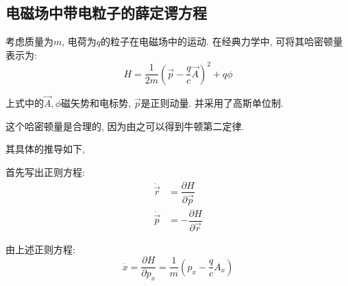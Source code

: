 \documentclass[a4paper, 11pt]{article}
\begin{document}
\begin{spacing}{1.2}
      \subsection{电磁场中带电粒子的薛定谔方程}

        考虑质量为$m$, 电荷为$q$的粒子在电磁场中的运动. 在经典力学中, 可将其哈密顿量表示为:
        \begin{equation}
          H = \dfrac{1}{2m}\left(\vec{p}-\dfrac{q}{c}\vec{A}\right)^2+q\phi
        \end{equation}

        上式中的$\vec{A}, \phi$磁矢势和电标势, $\vec{p}$是正则动量. 并采用了高斯单位制.

        这个哈密顿量是合理的, 因为由之可以得到牛顿第二定律.

        其具体的推导如下,

        首先写出正则方程:
        \begin{subequations}
          \begin{align}
            \dot{\vec{r}} &= \dfrac{\partial{}H}{\partial{}\vec{p}}\\
            \dot{\vec{p}} &= -\dfrac{\partial{}H}{\partial{}\vec{r}}
          \end{align}
        \end{subequations}

        由上述正则方程:
        \begin{equation}
          \dot{x} = \dfrac{\partial{}H}{\partial{}p_x} = \dfrac{1}{m}\left(p_x-\dfrac{q}{c}A_x\right)
        \end{equation}


\end{spacing}
\end{document}

